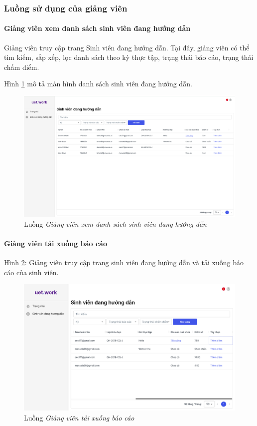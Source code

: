 \documentclass[./../main.tex]{subfiles}
\begin{document}
\subsubsection{Luồng sử dụng của giảng viên}

\paragraph*{Giảng viên xem danh sách sinh viên đang hướng dẫn}

Giảng viên truy cập trang Sinh viên đang hướng dẫn. Tại đây, giảng viên có thể tìm kiếm, sắp xếp, lọc danh sách theo kỳ thực tập, trạng thái báo cáo, trạng thái chấm điểm.

Hình \ref{fig:working_student_page} mô tả màn hình danh sách sinh viên đang hướng dẫn.

\begin{figure}[]
	\includegraphics[width=\linewidth]{./images/image8.png}
	\caption{Luồng \emph{Giảng viên xem danh sách sinh viên đang hướng dẫn}}
	\label{fig:working_student_page}
\end{figure}

\paragraph*{Giảng viên tải xuống báo cáo}
Hình \ref{fig:lecturer_access_students}: Giảng viên truy cập trang sinh viên đang hướng dẫn và tải xuống báo cáo của sinh viên.

\begin{figure}[]
	\includegraphics[width=\linewidth]{./images/image64.png}
	\caption{Luồng \emph{Giảng viên tải xuống báo cáo}}
	\label{fig:lecturer_access_students}
\end{figure}
\end{document}
